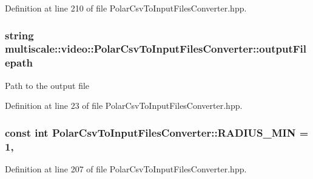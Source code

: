 Definition at line 210 of file Polar\-Csv\-To\-Input\-Files\-Converter.\-hpp.

\hypertarget{classmultiscale_1_1video_1_1PolarCsvToInputFilesConverter_a1033d31c9bfc7ccad08337c7b0fa6e6e}{
\subsubsection[{output\-Filepath}]{\setlength{\rightskip}{0pt plus 5cm}string multiscale\-::video\-::\-Polar\-Csv\-To\-Input\-Files\-Converter\-::output\-Filepath\hspace{0.3cm}{\ttfamily [private]}}}\label{classmultiscale_1_1video_1_1PolarCsvToInputFilesConverter_a1033d31c9bfc7ccad08337c7b0fa6e6e}
Path to the output file 

Definition at line 23 of file Polar\-Csv\-To\-Input\-Files\-Converter.\-hpp.

\hypertarget{classmultiscale_1_1video_1_1PolarCsvToInputFilesConverter_aeb8eeef6a83cd99ebfc47053a1ec99a7}{
\subsubsection[{R\-A\-D\-I\-U\-S\-\_\-\-M\-I\-N}]{\setlength{\rightskip}{0pt plus 5cm}const int Polar\-Csv\-To\-Input\-Files\-Converter\-::\-R\-A\-D\-I\-U\-S\-\_\-\-M\-I\-N = 1\hspace{0.3cm}{\ttfamily [static]}, {\ttfamily [private]}}}\label{classmultiscale_1_1video_1_1PolarCsvToInputFilesConverter_aeb8eeef6a83cd99ebfc47053a1ec99a7}


Definition at line 207 of file Polar\-Csv\-To\-Input\-Files\-Converter.\-hpp.

